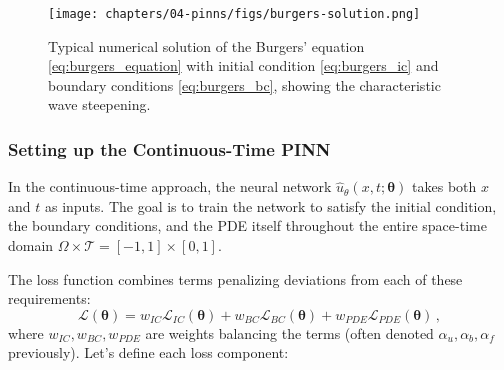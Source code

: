 \begin{figure}[htbp]
    \centering
    \texttt{[image: chapters/04-pinns/figs/burgers-solution.png]}
    \caption{Typical numerical solution of the Burgers' equation \eqref{eq:burgers_equation} with initial condition \eqref{eq:burgers_ic} and boundary conditions \eqref{eq:burgers_bc}, showing the characteristic wave steepening.}
    \label{fig:burgers-solution}
\end{figure}

\subsubsection{Setting up the Continuous-Time PINN}

In the continuous-time approach, the neural network $\hat{u}_\theta(x, t; \boldsymbol{\theta})$ takes both $x$ and $t$ as inputs. The goal is to train the network to satisfy the initial condition, the boundary conditions, and the PDE itself throughout the entire space-time domain $\Omega \times \mathcal{T} = [-1, 1] \times [0, 1]$.


The loss function combines terms penalizing deviations from each of these requirements:
%
\begin{equation}
\mathcal{L}(\boldsymbol{\theta}) = w_{IC}\mathcal{L}_{IC}(\boldsymbol{\theta}) + w_{BC}\mathcal{L}_{BC}(\boldsymbol{\theta}) + w_{PDE}\mathcal{L}_{PDE}(\boldsymbol{\theta}) \,,
\label{eq:loss_total_burgers}
\end{equation}
%
where $w_{IC}, w_{BC}, w_{PDE}$ are weights balancing the terms (often denoted $\alpha_u, \alpha_b, \alpha_f$ previously). Let's define each loss component:

